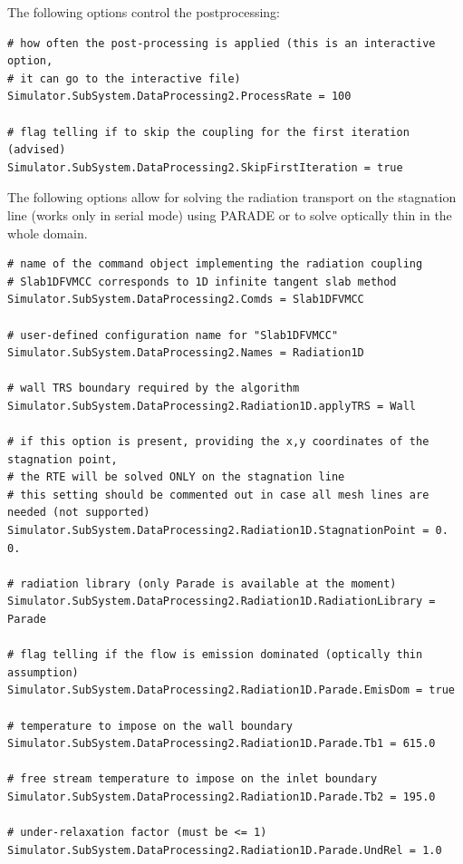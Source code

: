 \documentclass[11pt]{article}
\begin{document}
The following options control the postprocessing:

\begin{lstlisting}[breaklines]
# how often the post-processing is applied (this is an interactive option, 
# it can go to the interactive file)
Simulator.SubSystem.DataProcessing2.ProcessRate = 100

# flag telling if to skip the coupling for the first iteration (advised)
Simulator.SubSystem.DataProcessing2.SkipFirstIteration = true
\end{lstlisting}

The following options allow for solving the radiation transport on the stagnation line (works only in serial mode) 
using PARADE or to solve optically thin in the whole domain.

\begin{lstlisting}[breaklines]
# name of the command object implementing the radiation coupling
# Slab1DFVMCC corresponds to 1D infinite tangent slab method
Simulator.SubSystem.DataProcessing2.Comds = Slab1DFVMCC

# user-defined configuration name for "Slab1DFVMCC"
Simulator.SubSystem.DataProcessing2.Names = Radiation1D

# wall TRS boundary required by the algorithm 
Simulator.SubSystem.DataProcessing2.Radiation1D.applyTRS = Wall

# if this option is present, providing the x,y coordinates of the stagnation point,
# the RTE will be solved ONLY on the stagnation line
# this setting should be commented out in case all mesh lines are needed (not supported)
Simulator.SubSystem.DataProcessing2.Radiation1D.StagnationPoint = 0. 0.

# radiation library (only Parade is available at the moment)
Simulator.SubSystem.DataProcessing2.Radiation1D.RadiationLibrary = Parade

# flag telling if the flow is emission dominated (optically thin assumption) 
Simulator.SubSystem.DataProcessing2.Radiation1D.Parade.EmisDom = true

# temperature to impose on the wall boundary 
Simulator.SubSystem.DataProcessing2.Radiation1D.Parade.Tb1 = 615.0

# free stream temperature to impose on the inlet boundary 
Simulator.SubSystem.DataProcessing2.Radiation1D.Parade.Tb2 = 195.0

# under-relaxation factor (must be <= 1)
Simulator.SubSystem.DataProcessing2.Radiation1D.Parade.UndRel = 1.0
\end{lstlisting}
\end{document}
